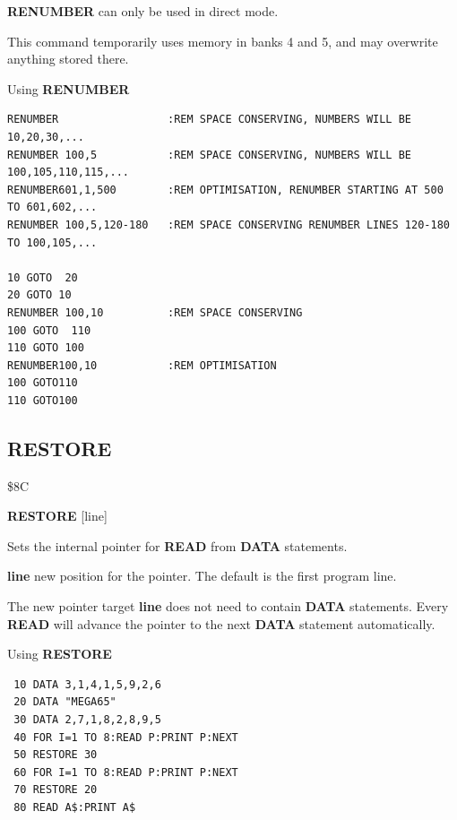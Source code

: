 \begin{description}[leftmargin=2cm,style=nextline]
                 {\bf RENUMBER} can only be used in direct mode.

                 This command temporarily uses memory in banks 4 and 5, and
                 may overwrite anything stored there.

\item [Examples:] Using {\bf RENUMBER}
\begin{tcolorbox}[colback=black,coltext=white]
\verbatimfont{\codefont}
\begin{verbatim}
RENUMBER                 :REM SPACE CONSERVING, NUMBERS WILL BE 10,20,30,...
RENUMBER 100,5           :REM SPACE CONSERVING, NUMBERS WILL BE 100,105,110,115,...
RENUMBER601,1,500        :REM OPTIMISATION, RENUMBER STARTING AT 500 TO 601,602,...
RENUMBER 100,5,120-180   :REM SPACE CONSERVING RENUMBER LINES 120-180 TO 100,105,...

10 GOTO  20
20 GOTO 10
RENUMBER 100,10          :REM SPACE CONSERVING
100 GOTO  110
110 GOTO 100
RENUMBER100,10           :REM OPTIMISATION
100 GOTO110
110 GOTO100
\end{verbatim}
\end{tcolorbox}
\end{description}


\newpage
\subsection{RESTORE}
\begin{description}[leftmargin=2cm,style=nextline]
\item [Token:] \$8C
\item [Format:] {\bf RESTORE} [line]
\item [Usage:]  Sets the internal pointer for
                {\bf READ} from {\bf DATA} statements.

                {\bf line} new position for the
                pointer. The default is the
                first program line.

\item [Remarks:] The new pointer target {\bf line}
                 does not need to contain {\bf DATA} statements.
                 Every {\bf READ} will advance
                 the pointer to the next {\bf DATA} statement automatically.
\item [Example:] Using {\bf RESTORE}

\begin{tcolorbox}[colback=black,coltext=white]
\verbatimfont{\codefont}
\begin{verbatim}
 10 DATA 3,1,4,1,5,9,2,6
 20 DATA "MEGA65"
 30 DATA 2,7,1,8,2,8,9,5
 40 FOR I=1 TO 8:READ P:PRINT P:NEXT
 50 RESTORE 30
 60 FOR I=1 TO 8:READ P:PRINT P:NEXT
 70 RESTORE 20
 80 READ A$:PRINT A$
\end{verbatim}
\end{tcolorbox}
\end{description}

